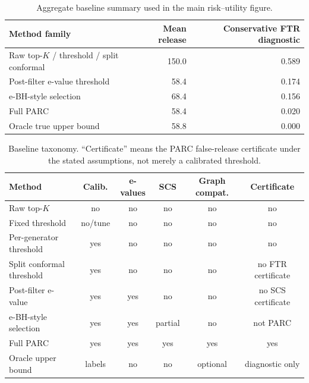 \documentclass[11pt]{article}
\begin{document}
\begin{table}[h]
\centering
\caption{Aggregate baseline summary used in the main risk--utility figure.}
\small
\begin{tabular}{lrr}
\toprule
Method family & Mean release & Conservative FTR diagnostic \\
\midrule
Raw top-\(K\) / threshold / split conformal & 150.0 & 0.589 \\
Post-filter e-value threshold & 58.4 & 0.174 \\
e-BH-style selection & 68.4 & 0.156 \\
Full PARC & 58.4 & 0.020 \\
Oracle true upper bound & 58.8 & 0.000 \\
\bottomrule
\end{tabular}
\end{table}

\begin{table}[h]
\centering
\caption{Baseline taxonomy. ``Certificate'' means the PARC false-release certificate under the stated assumptions, not merely a calibrated threshold.}
\scriptsize
\begin{tabular}{lccccc}
\toprule
Method & Calib. & e-values & SCS & Graph compat. & Certificate \\
\midrule
Raw top-\(K\) & no & no & no & no & no \\
Fixed threshold & no/tune & no & no & no & no \\
Per-generator threshold & yes & no & no & no & no \\
Split conformal threshold & yes & no & no & no & no FTR certificate \\
Post-filter e-value & yes & yes & no & no & no SCS certificate \\
e-BH-style selection & yes & yes & partial & no & not PARC \\
Full PARC & yes & yes & yes & yes & yes \\
Oracle upper bound & labels & no & no & optional & diagnostic only \\
\bottomrule
\end{tabular}
\end{table}
\end{document}
